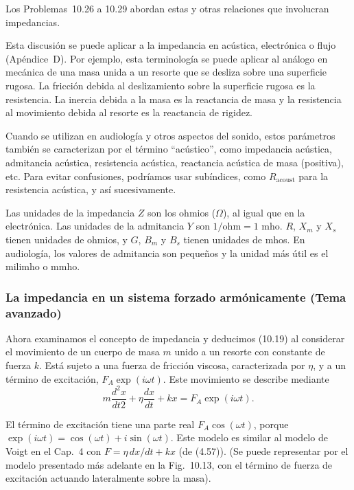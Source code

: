 \documentclass[12pt]{book}
\begin{document}
Los Problemas~10.26 a 10.29 abordan estas y otras relaciones que involucran impedancias.

Esta discusión se puede aplicar a la impedancia en acústica, electrónica o flujo (Apéndice~D). Por ejemplo, esta terminología se puede aplicar al análogo en mecánica de una masa unida a un resorte que se desliza sobre una superficie rugosa. La fricción debida al deslizamiento sobre la superficie rugosa es la resistencia. La inercia debida a la masa es la reactancia de masa y la resistencia al movimiento debida al resorte es la reactancia de rigidez.

Cuando se utilizan en audiología y otros aspectos del sonido, estos parámetros también se caracterizan por el término ``acústico'', como impedancia acústica, admitancia acústica, resistencia acústica, reactancia acústica de masa (positiva), etc. Para evitar confusiones, podríamos usar subíndices, como $R_{\text{acoust}}$ para la resistencia acústica, y así sucesivamente.

Las unidades de la impedancia $Z$ son los ohmios ($\Omega$), al igual que en la electrónica. Las unidades de la admitancia $Y$ son $1/\text{ohm} = 1\text{ mho}$. $R$, $X_m$ y $X_s$ tienen unidades de ohmios, y $G$, $B_m$ y $B_s$ tienen unidades de mhos. En audiología, los valores de admitancia son pequeños y la unidad más útil es el milimho o mmho.

\subsubsection*{La impedancia en un sistema forzado armónicamente (Tema avanzado)}

Ahora examinamos el concepto de impedancia y deducimos (10.19) al considerar el movimiento de un cuerpo de masa $m$ unido a un resorte con constante de fuerza $k$. Está sujeto a una fuerza de fricción viscosa, caracterizada por $\eta$, y a un término de excitación, $F_A \exp(i\omega t)$. Este movimiento se describe mediante
\begin{equation}
m\frac{d^2x}{dt2} + \eta\frac{dx}{dt} + kx = F_A \exp(i\omega t).
\label{eq:10.21}
\end{equation}

El término de excitación tiene una parte real $F_A \cos(\omega t)$, porque $\exp(i\omega t) = \cos(\omega t) + i \sin(\omega t)$. Este modelo es similar al modelo de Voigt en el Cap.~4 con $F = \eta \, dx/dt + kx$ (de (4.57)). (Se puede representar por el modelo presentado más adelante en la Fig.~10.13, con el término de fuerza de excitación actuando lateralmente sobre la masa).
\end{document}
